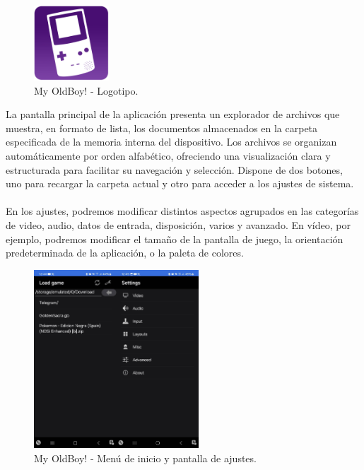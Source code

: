 \clearpage

\begin{figure}[h]
    \centering
    \includegraphics[width=0.25\textwidth]{include/images/myoldboy.png}
    \caption{My OldBoy! - Logotipo.}
    \label{figure:oldboylogo}
\end{figure}

La pantalla principal de la aplicación presenta un explorador de archivos que muestra, en formato de lista, los documentos almacenados en la carpeta especificada de la memoria interna del dispositivo. Los archivos se organizan automáticamente por orden alfabético, ofreciendo una visualización clara y estructurada para facilitar su navegación y selección. Dispone de dos botones, uno para recargar la carpeta actual y otro para acceder a los ajustes de sistema. 
\\\\
En los ajustes, podremos modificar distintos aspectos agrupados en las categorías de video, audio, datos de entrada, disposición, varios y avanzado. En vídeo, por ejemplo, podremos modificar el tamaño de la pantalla de juego, la orientación predeterminada de la aplicación, o la paleta de colores.

\begin{figure}[h]
    \centering
    \includegraphics[width=0.55\textwidth]{include/images/myoldboy2.jpg}
    \caption{My OldBoy! - Menú de inicio y pantalla de ajustes.}
    \label{figure:oldboy2}
\end{figure}

